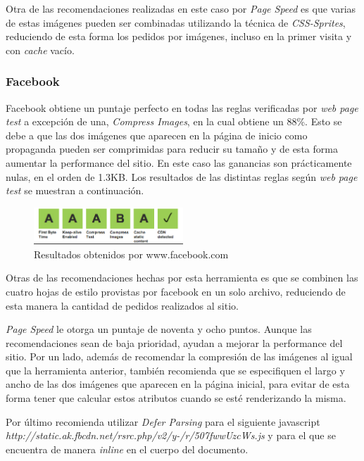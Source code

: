 Otra de las recomendaciones realizadas en este caso por \emph{Page Speed} es que varias de estas
imágenes pueden ser combinadas utilizando la técnica de \emph{CSS-Sprites}, reduciendo de esta forma los
pedidos por imágenes, incluso en la primer visita y con \emph{cache} vacío.

\subsubsection{Facebook}

Facebook obtiene un puntaje perfecto en todas las reglas verificadas por \emph{web page test} a excepción de una, \emph{Compress Images}, en la cual obtiene un 88\%. Esto se
debe a que las dos imágenes que aparecen en la página de inicio como propaganda pueden ser comprimidas para reducir su tamaño y de esta forma aumentar la performance del
sitio. En este caso las ganancias son prácticamente nulas, en el orden de 1.3KB. Los resultados de las distintas reglas según \emph{web page test}
se muestran a continuación.

\begin{figure}[h]
\centering
\includegraphics[width=0.5\textwidth]{figuras/lado_cliente/facebook/page_results.png}
  \caption{Resultados obtenidos por www.facebook.com}
    \label{fig.facebook_page_results}
\end{figure}

Otras de las recomendaciones hechas por esta herramienta es que se combinen las cuatro hojas de estilo provistas por facebook en un solo archivo, reduciendo de esta manera
la cantidad de pedidos realizados al sitio.

\emph{Page Speed} le otorga un puntaje de noventa y ocho puntos. Aunque las recomendaciones sean de baja prioridad, ayudan a mejorar la performance del sitio. Por un lado,
además de recomendar la compresión de las imágenes al igual que la herramienta anterior, también recomienda que se especifiquen el largo y ancho de las dos imágenes
que aparecen en la página inicial, para evitar de esta forma tener que calcular estos atributos cuando se esté renderizando la misma.

Por último recomienda utilizar \emph{Defer Parsing} para el siguiente javascript \emph{http://static.ak.fbcdn.net/rsrc.php/v2/y-/r/507fwwUzcWs.js} y para el que se encuentra
de manera \emph{inline} en el cuerpo del documento.

